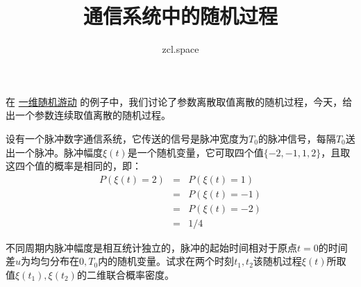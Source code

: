 \documentclass[10pt,a4paper,UTF8]{article}
\author{zcl.space}
\date{}
\title{通信系统中的随机过程}
\begin{document}
\maketitle
在 \href{one-dimension-random-walk.org}{一维随机游动} 的例子中，我们讨论了参数离散取值离散的随机过程，今天，给出一个参数连续取值离散的随机过程。

\begin{problem}
设有一个脉冲数字通信系统，它传送的信号是脉冲宽度为\(T_{0}\)的脉冲信号，每隔\(T_{0}\)送出一个脉冲。脉冲幅度\(\xi(t)\)是一个随机变量，它可取四个值\(\{-2,-1,1,2\}\)，且取这四个值的概率是相同的，即：
\begin{eqnarray*}
P(\xi(t) = 2)&=&P(\xi(t) = 1) \\
&=&P(\xi(t) = -1) \\
&=&P(\xi(t) = -2) \\
&=&1/4
\end{eqnarray*}

不同周期内脉冲幅度是相互统计独立的，脉冲的起始时间相对于原点\(t=0\)的时间差\(u\)为均匀分布在\(0,T_{0}\)内的随机变量。试求在两个时刻\(t_{1},t_{2}\)该随机过程\(\xi(t)\)所取值\(\xi(t_{1}),\xi(t_{2})\)的二维联合概率密度。
\end{problem}
\end{document}
